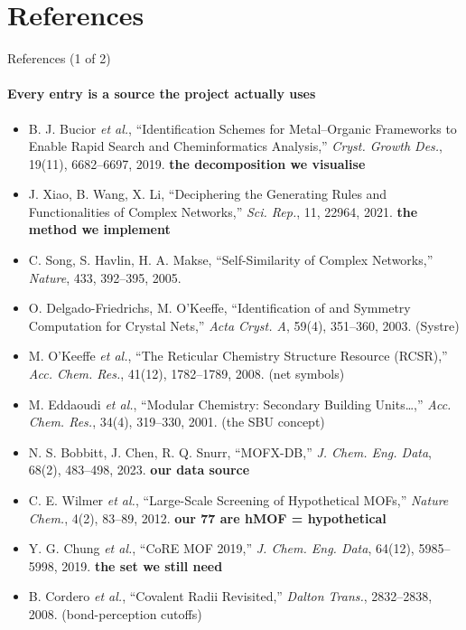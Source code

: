 \documentclass[aspectratio=169, 11pt]{beamer}
\begin{document}
\section{References}
\begin{frame}{References (1 of 2)}
\framesubtitle{Every entry is a source the project actually uses}
{\tiny
\begin{itemize}\itemsep2pt
\item[{[1]}] B. J. Bucior \textit{et al.}, ``Identification Schemes for Metal--Organic Frameworks
      to Enable Rapid Search and Cheminformatics Analysis,'' \textit{Cryst. Growth Des.},
      19(11), 6682--6697, 2019. \hfill \textcolor{coolBlue}{\textbf{the decomposition we visualise}}
\item[{[2]}] J. Xiao, B. Wang, X. Li, ``Deciphering the Generating Rules and Functionalities of
      Complex Networks,'' \textit{Sci. Rep.}, 11, 22964, 2021.
      \hfill \textcolor{coolBlue}{\textbf{the method we implement}}
\item[{[3]}] C. Song, S. Havlin, H. A. Makse, ``Self-Similarity of Complex Networks,''
      \textit{Nature}, 433, 392--395, 2005.
\item[{[4]}] O. Delgado-Friedrichs, M. O'Keeffe, ``Identification of and Symmetry Computation
      for Crystal Nets,'' \textit{Acta Cryst. A}, 59(4), 351--360, 2003. \hfill (Systre)
\item[{[5]}] M. O'Keeffe \textit{et al.}, ``The Reticular Chemistry Structure Resource (RCSR),''
      \textit{Acc. Chem. Res.}, 41(12), 1782--1789, 2008. \hfill (net symbols)
\item[{[6]}] M. Eddaoudi \textit{et al.}, ``Modular Chemistry: Secondary Building Units\ldots,''
      \textit{Acc. Chem. Res.}, 34(4), 319--330, 2001. \hfill (the SBU concept)
\item[{[7]}] N. S. Bobbitt, J. Chen, R. Q. Snurr, ``MOFX-DB,'' \textit{J. Chem. Eng. Data},
      68(2), 483--498, 2023. \hfill \textcolor{coolBlue}{\textbf{our data source}}
\item[{[8]}] C. E. Wilmer \textit{et al.}, ``Large-Scale Screening of Hypothetical MOFs,''
      \textit{Nature Chem.}, 4(2), 83--89, 2012.
      \hfill \textcolor{warnRed}{\textbf{our 77 are hMOF = hypothetical}}
\item[{[9]}] Y. G. Chung \textit{et al.}, ``CoRE MOF 2019,'' \textit{J. Chem. Eng. Data},
      64(12), 5985--5998, 2019. \hfill \textcolor{warnRed}{\textbf{the set we still need}}
\item[{[10]}] B. Cordero \textit{et al.}, ``Covalent Radii Revisited,'' \textit{Dalton Trans.},
      2832--2838, 2008. \hfill (bond-perception cutoffs)
\end{itemize}}
\end{frame}
\end{document}
